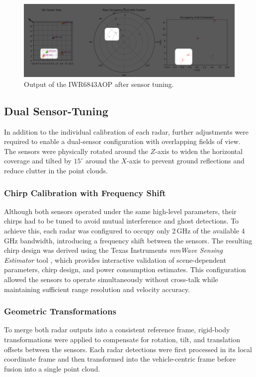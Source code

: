 \begin{figure}[!htbp]
    \centering
    \includegraphics[width=1.0\linewidth]{images/calib_ex2.png}
    \caption{Output of the IWR6843AOP after sensor tuning.}
    \label{fig:IWR6843AOP Calibration example2 for the sensor}
\end{figure}

\subsection{Dual Sensor-Tuning} 
In addition to the individual calibration of each radar, further adjustments were required to enable a dual-sensor configuration with overlapping fields of view. 
The sensors were physically rotated around the $Z$-axis to widen the horizontal coverage and tilted by $15^\circ$ around the $X$-axis to prevent ground reflections and reduce clutter in the point clouds. 

\subsubsection{Chirp Calibration with Frequency Shift} 
Although both sensors operated under the same high-level parameters, their chirps had to be tuned to avoid mutual interference and ghost detections. 
To achieve this, each radar was configured to occupy only 2\,GHz of the available 4\,GHz bandwidth, introducing a frequency shift between the sensors. 
The resulting chirp design was derived using the Texas Instruments \textit{mmWave Sensing Estimator} tool \cite{mmwave_sensing_estimator}, which provides interactive validation of scene-dependent parameters, chirp design, and power consumption estimates. 
This configuration allowed the sensors to operate simultaneously without cross-talk while maintaining sufficient range resolution and velocity accuracy. 

\subsubsection{Geometric Transformations} 
To merge both radar outputs into a consistent reference frame, rigid-body transformations were applied to compensate for rotation, tilt, and translation offsets between the sensors. 
Each radar detections were first processed in its local coordinate frame and then transformed into the vehicle-centric frame before fusion into a single point cloud. 

